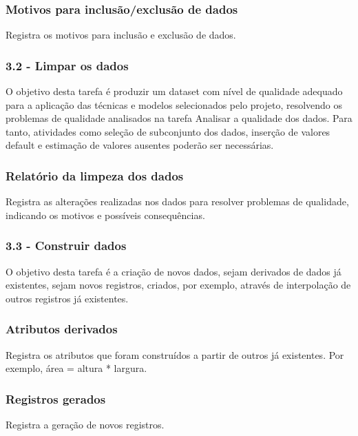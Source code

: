 \subsubsection*{Motivos para inclusão/exclusão de dados}

Registra os motivos para inclusão e exclusão de dados.

\subsubsection*{3.2 - Limpar os dados}

O objetivo desta tarefa é produzir um dataset com nível de qualidade adequado para a aplicação das técnicas e modelos selecionados pelo projeto, resolvendo os problemas de qualidade analisados na tarefa Analisar a qualidade dos dados. Para tanto, atividades como seleção de subconjunto dos dados, inserção de valores default e estimação de valores ausentes poderão ser necessárias.

\subsubsection*{Relatório da limpeza dos dados}

Registra as alterações realizadas nos dados para resolver problemas de qualidade, indicando os motivos e possíveis consequências.

\subsubsection*{\textbf{3.3 - Construir dados}}

O objetivo desta tarefa é a criação de novos dados, sejam derivados de dados já existentes, sejam novos registros, criados, por exemplo, através de interpolação de outros registros já existentes.

\subsubsection*{Atributos derivados}

Registra os atributos que foram construídos a partir de outros já existentes. Por exemplo, área = altura * largura.

\subsubsection*{Registros gerados}

Registra a geração de novos registros. 

